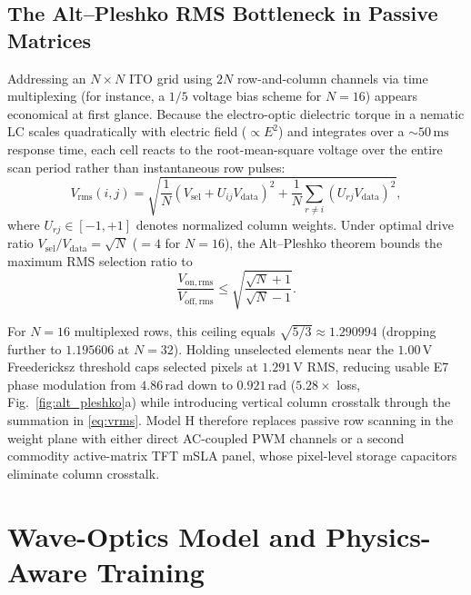 \documentclass[journal]{IEEEtran}
\begin{document}
\subsection{The Alt--Pleshko RMS Bottleneck in Passive Matrices}
Addressing an $N\times N$ ITO grid using $2N$ row-and-column channels via time multiplexing (for instance, a $1/5$ voltage bias scheme for $N=16$) appears economical at first glance. Because the electro-optic dielectric torque in a nematic LC scales quadratically with electric field ($\propto E^2$) and integrates over a $\sim 50\,\text{ms}$ response time, each cell reacts to the root-mean-square voltage over the entire scan period rather than instantaneous row pulses:
\begin{equation}
  V_{\mathrm{rms}}(i,j) = \sqrt{\frac{1}{N}\left(V_{\mathrm{sel}} + U_{ij}V_{\mathrm{data}}\right)^2 + \frac{1}{N}\sum_{r\neq i}\left(U_{rj}V_{\mathrm{data}}\right)^2},
  \label{eq:vrms}
\end{equation}
where $U_{rj}\in[-1, +1]$ denotes normalized column weights. Under optimal drive ratio $V_{\mathrm{sel}}/V_{\mathrm{data}} = \sqrt{N}$ ($=4$ for $N=16$), the Alt--Pleshko theorem \cite{alt1974scanning} bounds the maximum RMS selection ratio to
\begin{equation}
  \frac{V_{\mathrm{on,rms}}}{V_{\mathrm{off,rms}}} \le \sqrt{\frac{\sqrt{N}+1}{\sqrt{N}-1}}.
  \label{eq:alt_pleshko}
\end{equation}

For $N=16$ multiplexed rows, this ceiling equals $\sqrt{5/3} \approx 1.290994$ (dropping further to $1.195606$ at $N=32$). Holding unselected elements near the $1.00\,\text{V}$ Freedericksz threshold caps selected pixels at $1.291\,\text{V}$ RMS, reducing usable E7 phase modulation from $4.86\,\text{rad}$ down to $0.921\,\text{rad}$ ($5.28\times$ loss, Fig.~\ref{fig:alt_pleshko}a) while introducing vertical column crosstalk through the summation in \eqref{eq:vrms}. Model H therefore replaces passive row scanning in the weight plane with either direct AC-coupled PWM channels or a second commodity active-matrix TFT mSLA panel, whose pixel-level storage capacitors eliminate column crosstalk.

\section{Wave-Optics Model and Physics-Aware Training}
\end{document}
